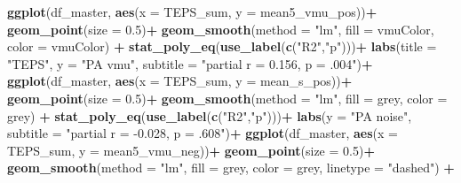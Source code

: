 \documentclass[
]{article}
\newenvironment{Shaded}{\begin{snugshade}}{\end{snugshade}}
\newcommand{\AttributeTok}[1]{\textcolor[rgb]{0.13,0.29,0.53}{#1}}
\newcommand{\FloatTok}[1]{\textcolor[rgb]{0.00,0.00,0.81}{#1}}
\newcommand{\FunctionTok}[1]{\textcolor[rgb]{0.13,0.29,0.53}{\textbf{#1}}}
\newcommand{\NormalTok}[1]{#1}
\newcommand{\SpecialCharTok}[1]{\textcolor[rgb]{0.81,0.36,0.00}{\textbf{#1}}}
\newcommand{\StringTok}[1]{\textcolor[rgb]{0.31,0.60,0.02}{#1}}
\begin{document}
\begin{Shaded}
\begin{Highlighting}[]
\FunctionTok{ggplot}\NormalTok{(df\_master, }\FunctionTok{aes}\NormalTok{(}\AttributeTok{x =}\NormalTok{ TEPS\_sum, }\AttributeTok{y =}\NormalTok{ mean5\_vmu\_pos))}\SpecialCharTok{+}
  \FunctionTok{geom\_point}\NormalTok{(}\AttributeTok{size =} \FloatTok{0.5}\NormalTok{)}\SpecialCharTok{+}
  \FunctionTok{geom\_smooth}\NormalTok{(}\AttributeTok{method =} \StringTok{"lm"}\NormalTok{, }\AttributeTok{fill =}\NormalTok{ vmuColor, }\AttributeTok{color =}\NormalTok{ vmuColor) }\SpecialCharTok{+}
  \FunctionTok{stat\_poly\_eq}\NormalTok{(}\FunctionTok{use\_label}\NormalTok{(}\FunctionTok{c}\NormalTok{(}\StringTok{"R2"}\NormalTok{,}\StringTok{"p"}\NormalTok{)))}\SpecialCharTok{+}
  \FunctionTok{labs}\NormalTok{(}\AttributeTok{title =} \StringTok{"TEPS"}\NormalTok{,}
       \AttributeTok{y =} \StringTok{"PA vmu"}\NormalTok{,}
       \AttributeTok{subtitle =} \StringTok{"partial r = 0.156, p = .004"}\NormalTok{)}\SpecialCharTok{+}
\FunctionTok{ggplot}\NormalTok{(df\_master, }\FunctionTok{aes}\NormalTok{(}\AttributeTok{x =}\NormalTok{ TEPS\_sum, }\AttributeTok{y =}\NormalTok{ mean\_s\_pos))}\SpecialCharTok{+}
  \FunctionTok{geom\_point}\NormalTok{(}\AttributeTok{size =} \FloatTok{0.5}\NormalTok{)}\SpecialCharTok{+}
  \FunctionTok{geom\_smooth}\NormalTok{(}\AttributeTok{method =} \StringTok{"lm"}\NormalTok{, }\AttributeTok{fill =} \StringTok{\textquotesingle{}grey\textquotesingle{}}\NormalTok{, }\AttributeTok{color =} \StringTok{\textquotesingle{}grey\textquotesingle{}}\NormalTok{) }\SpecialCharTok{+}
  \FunctionTok{stat\_poly\_eq}\NormalTok{(}\FunctionTok{use\_label}\NormalTok{(}\FunctionTok{c}\NormalTok{(}\StringTok{"R2"}\NormalTok{,}\StringTok{"p"}\NormalTok{)))}\SpecialCharTok{+}
  \FunctionTok{labs}\NormalTok{(}\AttributeTok{y =} \StringTok{"PA noise"}\NormalTok{,}
       \AttributeTok{subtitle =} \StringTok{"partial r = {-}0.028, p = .608"}\NormalTok{)}\SpecialCharTok{+}
\FunctionTok{ggplot}\NormalTok{(df\_master, }\FunctionTok{aes}\NormalTok{(}\AttributeTok{x =}\NormalTok{ TEPS\_sum, }\AttributeTok{y =}\NormalTok{ mean5\_vmu\_neg))}\SpecialCharTok{+}
  \FunctionTok{geom\_point}\NormalTok{(}\AttributeTok{size =} \FloatTok{0.5}\NormalTok{)}\SpecialCharTok{+}
  \FunctionTok{geom\_smooth}\NormalTok{(}\AttributeTok{method =} \StringTok{"lm"}\NormalTok{, }\AttributeTok{fill =} \StringTok{\textquotesingle{}grey\textquotesingle{}}\NormalTok{, }\AttributeTok{color =} \StringTok{\textquotesingle{}grey\textquotesingle{}}\NormalTok{, }\AttributeTok{linetype =} \StringTok{"dashed"}\NormalTok{) }\SpecialCharTok{+}

\end{Highlighting}
\end{Shaded}
\end{document}
